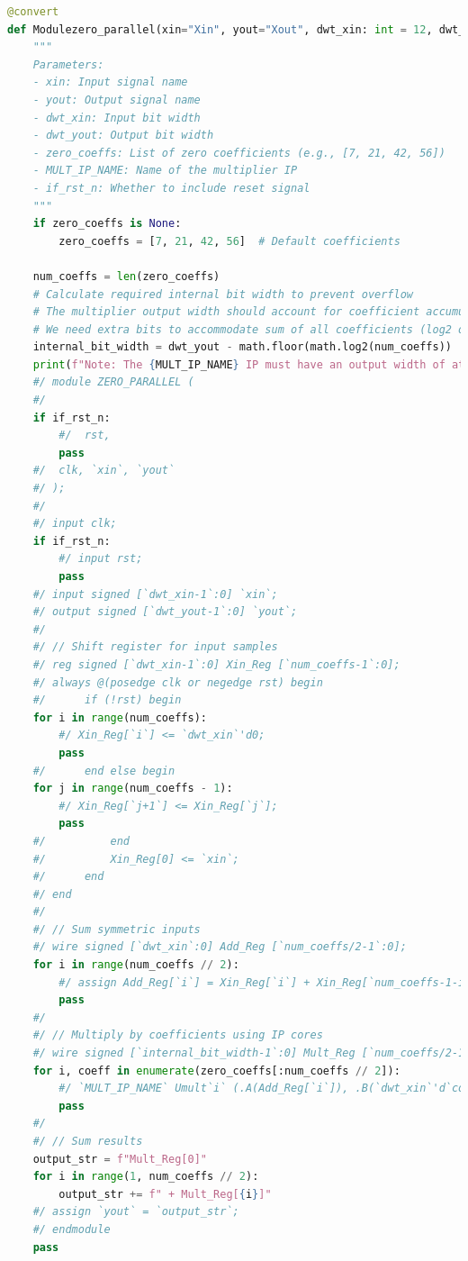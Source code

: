 \begin{lstlisting}[language=python,caption = {IIR滤波器的参数化设计}]
@convert
def Modulezero_parallel(xin="Xin", yout="Xout", dwt_xin: int = 12, dwt_yout: int = 26, zero_coeffs=None, MULT_IP_NAME="MULT", if_rst_n=True):
    """
    Parameters:
    - xin: Input signal name
    - yout: Output signal name
    - dwt_xin: Input bit width
    - dwt_yout: Output bit width
    - zero_coeffs: List of zero coefficients (e.g., [7, 21, 42, 56])
    - MULT_IP_NAME: Name of the multiplier IP
    - if_rst_n: Whether to include reset signal
    """
    if zero_coeffs is None:
        zero_coeffs = [7, 21, 42, 56]  # Default coefficients

    num_coeffs = len(zero_coeffs)
    # Calculate required internal bit width to prevent overflow
    # The multiplier output width should account for coefficient accumulation
    # We need extra bits to accommodate sum of all coefficients (log2 of the number of terms)
    internal_bit_width = dwt_yout - math.floor(math.log2(num_coeffs))
    print(f"Note: The {MULT_IP_NAME} IP must have an output width of at least {internal_bit_width} bits to prevent adder overflow")
    #/ module ZERO_PARALLEL (
    #/ 
    if if_rst_n:
        #/  rst,
        pass
    #/  clk, `xin`, `yout`
    #/ );
    #/ 
    #/ input clk;
    if if_rst_n:
        #/ input rst;
        pass
    #/ input signed [`dwt_xin-1`:0] `xin`;
    #/ output signed [`dwt_yout-1`:0] `yout`;
    #/ 
    #/ // Shift register for input samples
    #/ reg signed [`dwt_xin-1`:0] Xin_Reg [`num_coeffs-1`:0];
    #/ always @(posedge clk or negedge rst) begin
    #/      if (!rst) begin
    for i in range(num_coeffs):
        #/ Xin_Reg[`i`] <= `dwt_xin`'d0;
        pass
    #/      end else begin
    for j in range(num_coeffs - 1):
        #/ Xin_Reg[`j+1`] <= Xin_Reg[`j`];
        pass
    #/          end 
    #/          Xin_Reg[0] <= `xin`;
    #/      end
    #/ end
    #/ 
    #/ // Sum symmetric inputs
    #/ wire signed [`dwt_xin`:0] Add_Reg [`num_coeffs/2-1`:0];
    for i in range(num_coeffs // 2):
        #/ assign Add_Reg[`i`] = Xin_Reg[`i`] + Xin_Reg[`num_coeffs-1-i`];
        pass
    #/ 
    #/ // Multiply by coefficients using IP cores
    #/ wire signed [`internal_bit_width-1`:0] Mult_Reg [`num_coeffs/2-1`:0];
    for i, coeff in enumerate(zero_coeffs[:num_coeffs // 2]):
        #/ `MULT_IP_NAME` Umult`i` (.A(Add_Reg[`i`]), .B(`dwt_xin`'d`coeff`), .P(Mult_Reg[`i`]));
        pass
    #/ 
    #/ // Sum results
    output_str = f"Mult_Reg[0]"
    for i in range(1, num_coeffs // 2):
        output_str += f" + Mult_Reg[{i}]"
    #/ assign `yout` = `output_str`;
    #/ endmodule
    pass



\end{lstlisting}
